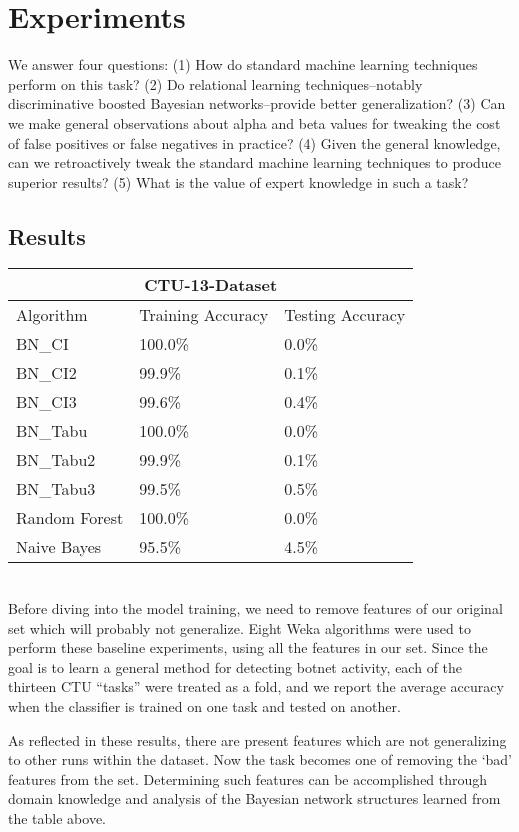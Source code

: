 \documentclass[letterpaper]{article}
\begin{document}
\section{Experiments}

We answer four questions: (1) How do standard machine learning techniques perform on this task? (2) Do relational learning techniques--notably discriminative boosted Bayesian networks--provide better generalization? (3) Can we make general observations about alpha and beta values for tweaking the cost of false positives or false negatives in practice? (4) Given the general knowledge, can we retroactively tweak the standard machine learning techniques to produce superior results? (5) What is the value of expert knowledge in such a task?

\subsection{Results}

\begin{tabular}{ |p{2.3cm}|p{1.9cm}|p{1.9cm}|  }
\hline
\multicolumn{3}{|c|}{CTU-13-Dataset} \\
\hline
Algorithm & Training Accuracy & Testing Accuracy \\
\hline
BN\_CI & 100.0\% & 0.0\% \\
BN\_CI2 & 99.9\% & 0.1\% \\
BN\_CI3 & 99.6\% & 0.4\% \\
BN\_Tabu & 100.0\% & 0.0\% \\
BN\_Tabu2 & 99.9\% & 0.1\% \\
BN\_Tabu3 & 99.5\% & 0.5\% \\
Random Forest & 100.0\% & 0.0\% \\
Naive Bayes & 95.5\% & 4.5\% \\
\hline
\end{tabular}\\

Before diving into the model training, we need to remove features of our original set which will probably not generalize.  Eight Weka \cite{witten2016data} algorithms were used to perform these baseline experiments, using all the features in our set. Since the goal is to learn a general method for detecting botnet activity, each of the thirteen CTU ``tasks'' were treated as a fold, and we report the average accuracy when the classifier is trained on one task and tested on another.

As reflected in these results, there are present features which are not generalizing to other runs within the dataset.  Now the task becomes one of removing the `bad' features from the set.  Determining such features can be accomplished through domain knowledge and analysis of the Bayesian network structures learned from the table above.
\end{document}
